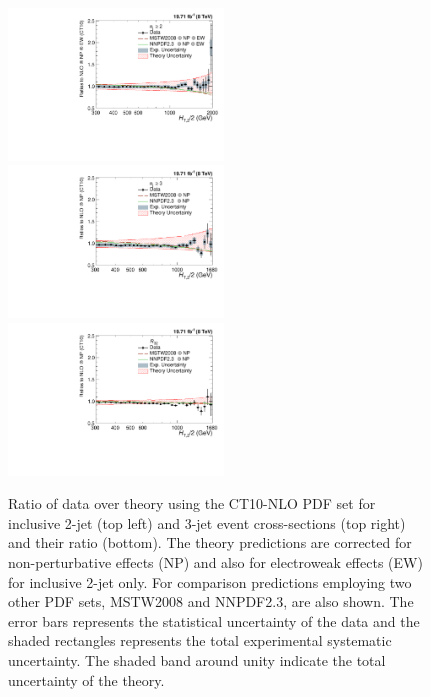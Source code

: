 \begin{figure}[!ht]
 \begin{center}
 \hspace*{-5mm}\includegraphics[width=0.51\textwidth]{Plots_HT_2_150/Comparison_data_NLO_Pdfs_2_EW.pdf}%
 ~~\includegraphics[width=0.51\textwidth]{Plots_HT_2_150/Comparison_data_NLO_Pdfs_3.pdf}\\
 \includegraphics[width=0.51\textwidth]{Plots_HT_2_150/Comparison_data_NLO_Pdfs_ratio_32.pdf}\\
 \caption[Ratio of data over theory using the CT10-NLO PDF set.]{Ratio of data over theory using the CT10-NLO PDF set for inclusive 2-jet (top left) and 3-jet event cross-sections (top right) and their ratio \ratio (bottom). The theory predictions are corrected for non-perturbative effects (NP) and also for electroweak effects (EW) for inclusive 2-jet only. For comparison predictions employing two other PDF sets, MSTW2008 and NNPDF2.3, are also shown. The error bars represents the statistical uncertainty of the data and the shaded rectangles represents the total experimental systematic uncertainty. The shaded band around unity indicate the total uncertainty of the theory.}
 \label{fig:data_NLOPdfs}
 \end{center}
\end{figure}

